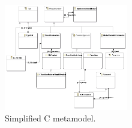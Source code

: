 \begin{figure}
\begin{center}
  \includegraphics[width=0.48\textwidth]{figures/CModelclassdiagram}
  \caption{Simplified C metamodel. }
  \label{fig:CModelclassdiagram}
\end{center}
\end{figure}










































